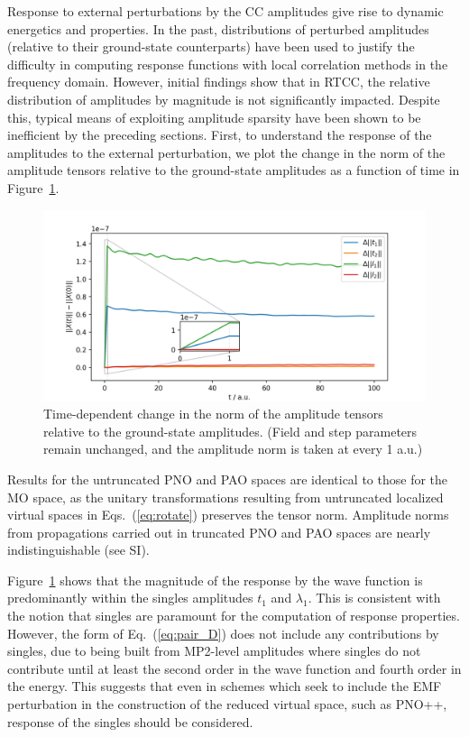 Response to external perturbations by the CC amplitudes give rise to
dynamic energetics and properties. In the past, distributions of perturbed amplitudes
(relative to their ground-state counterparts) have been used to justify the 
difficulty in computing response functions with local correlation methods in the 
frequency domain. 
\cite{McAlexander2016,Crawford2019,DCunha2021} 
However, initial findings show that in RTCC, the relative distribution of amplitudes 
by magnitude is not significantly impacted.\cite{Crawford2019} 
Despite this, typical means of exploiting amplitude
sparsity have been shown to be inefficient by the preceding sections. 
First, to understand the response of 
the amplitudes to the external perturbation, we plot the 
change in the norm of the amplitude tensors relative to the ground-state amplitudes 
as a function of time in Figure~\ref{fig:norm}.
\begin{figure} 
    \centering
    \includegraphics[scale=.6]{p3/figures/amp_norm.png}
    \caption{Time-dependent change in the norm of the amplitude 
    tensors relative to the ground-state amplitudes.
    (Field and step parameters remain unchanged, and 
    the amplitude norm is taken at every 1 a.u.)}
    \label{fig:norm}
\end{figure}
Results for the untruncated PNO and PAO spaces are identical to those
for the MO space, as the unitary transformations resulting from untruncated localized virtual spaces
in Eqs.~(\ref{eq:rotate}) preserves the tensor norm.
Amplitude norms from propagations carried out in truncated PNO and PAO spaces
are nearly indistinguishable (see SI).

Figure~\ref{fig:norm} shows that the magnitude of the response by the wave function
is predominantly within the singles amplitudes $t_1$ and $\lambda_1$. This is 
consistent with the notion that singles are paramount for the computation of 
response properties.\cite{Christiansen1995,Koch1997} However, the form of Eq.~(\ref{eq:pair_D})
does not include any contributions by singles, due to being built from MP2-level
amplitudes where singles do not contribute until at least the second order 
in the wave function and fourth order in the energy. This suggests that even in schemes
which seek to include the EMF perturbation in the construction of the reduced virtual space,
such as PNO++,\cite{DCunha2021} response of the singles should be considered.

